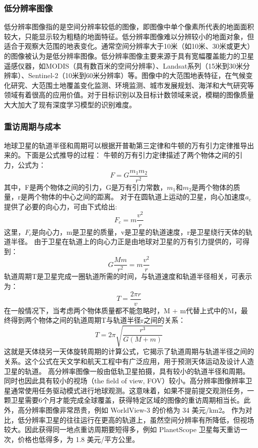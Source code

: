 \subsubsection{低分辨率图像}

低分辨率图像指的是空间分辨率较低的图像，即图像中单个像素所代表的地面面积较大，只能显示较为粗糙的地面特征。低分辨率图像难以分辨较小的地面对象，但适合于观察大范围的地表变化。通常空间分辨率大于10米（如10米、30米或更大）的图像被认为是低分辨率图像。低分辨率图像主要来源于具有宽幅覆盖能力的卫星遥感仪器，如MODIS（具有数百米的空间分辨率）、Landsat系列（15米到30米分辨率）、Sentinel-2（10米到60米分辨率）等。图像中的大范围地表特征，在气候变化研究、大范围土地覆盖变化监测、环境监测、城市发展规划、海洋和大气研究等领域有着很高的应用价值。对于目标识别以及目标计数领域来说，模糊的图像质量大大加大了现有深度学习模型的识别难度。


\subsubsection{重访周期与成本}
地球卫星的轨道半径和周期可以根据开普勒第三定律和牛顿的万有引力定律推导出来的。下面是公式推导的过程：
牛顿的万有引力定律描述了两个物体之间的引力，公式为：
\begin{equation}
    F = G \frac{m_1 m_2}{r^2}​​
\end{equation}
其中，F是两个物体之间的引力，G是万有引力常数，$m_1​$和$m_2$​是两个物体的质量，r是两个物体的中心之间的距离。
对于在圆轨道上运动的卫星，向心加速度$a_c$提供了必要的向心力，可由下式给出:
\begin{equation}
    F_c = m \frac{v^2}{r}​​​
\end{equation}
这里，$F_c$​是向心力，m是卫星的质量，v是卫星的轨道速度，r是卫星绕行天体的轨道半径。
由于卫星在轨道上的向心力正是由地球对卫星的万有引力提供的，可得到：
\begin{equation}
    G \frac{M m}{r^2} = m \frac{v^2}{r}​​​​
\end{equation}
轨道周期T是卫星完成一圈轨道所需的时间，与轨道速度和轨道半径相关，可表示为：
\begin{equation}
    T = \frac{2\pi r}{v}​​​​
\end{equation}
在一般情况下，当考虑两个物体质量都不能忽略时，M + m代替上式中的M，最终得到两个物体之间的轨道周期T与轨道半径r之间的关系：
\begin{equation}
    T = 2\pi \sqrt{\frac{r^3}{G (M + m)}}​​​​
\end{equation}
这就是天体绕另一天体旋转周期的计算公式，它揭示了轨道周期与轨道半径之间的关系。这个公式在天文学和航天工程中有广泛应用，用于预测天体运动及设计人造卫星的轨道。
高分辨率图像一般由低轨卫星拍摄，具有较小的轨道半径和周期。同时也因此具有较小的视场（the field of view, FOV）较小。高分辨率图像辨率卫星通常使用任务驱动模式进行地球观测。这意味着，如果不提前提交观测任务，一颗卫星需要6个月才能完成全球覆盖，获得特定区域的图像的重访周期相当长。此外，高分辨率图像非常昂贵，例如 WorldView-3 的价格为 34 美元/km2。
作为对比，低分辨率卫星的往往运行在更高的轨道上，虽然空间分辨率有所降低，但视场较大。因此获得同一地点重访周期要短得多，例如 PlanetScope 卫星每天重访一次，价格也低得多，为 1.8 美元/平方公里。


